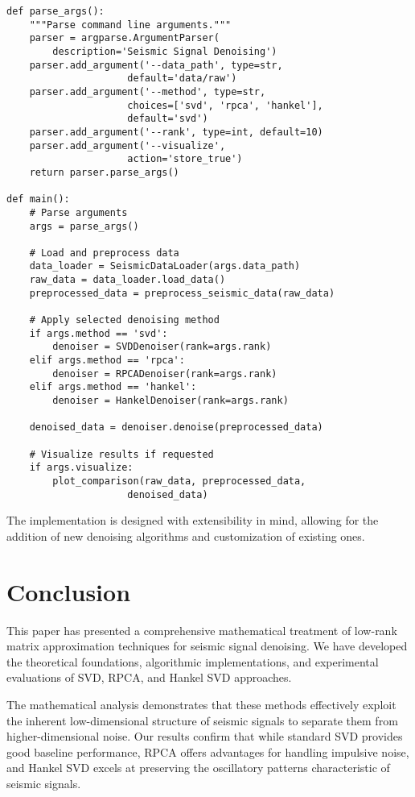 \documentclass[11pt]{article}
\begin{document}
\begin{lstlisting}
def parse_args():
    """Parse command line arguments."""
    parser = argparse.ArgumentParser(
        description='Seismic Signal Denoising')
    parser.add_argument('--data_path', type=str, 
                     default='data/raw')
    parser.add_argument('--method', type=str, 
                     choices=['svd', 'rpca', 'hankel'], 
                     default='svd')
    parser.add_argument('--rank', type=int, default=10)
    parser.add_argument('--visualize', 
                     action='store_true')
    return parser.parse_args()

def main():
    # Parse arguments
    args = parse_args()
    
    # Load and preprocess data
    data_loader = SeismicDataLoader(args.data_path)
    raw_data = data_loader.load_data()
    preprocessed_data = preprocess_seismic_data(raw_data)
    
    # Apply selected denoising method
    if args.method == 'svd':
        denoiser = SVDDenoiser(rank=args.rank)
    elif args.method == 'rpca':
        denoiser = RPCADenoiser(rank=args.rank)
    elif args.method == 'hankel':
        denoiser = HankelDenoiser(rank=args.rank)
    
    denoised_data = denoiser.denoise(preprocessed_data)
    
    # Visualize results if requested
    if args.visualize:
        plot_comparison(raw_data, preprocessed_data, 
                     denoised_data)
\end{lstlisting}

The implementation is designed with extensibility in mind, allowing for the addition of new denoising algorithms and customization of existing ones.

\section{Conclusion}
This paper has presented a comprehensive mathematical treatment of low-rank matrix approximation techniques for seismic signal denoising. We have developed the theoretical foundations, algorithmic implementations, and experimental evaluations of SVD, RPCA, and Hankel SVD approaches.

The mathematical analysis demonstrates that these methods effectively exploit the inherent low-dimensional structure of seismic signals to separate them from higher-dimensional noise. Our results confirm that while standard SVD provides good baseline performance, RPCA offers advantages for handling impulsive noise, and Hankel SVD excels at preserving the oscillatory patterns characteristic of seismic signals.
\end{document}
